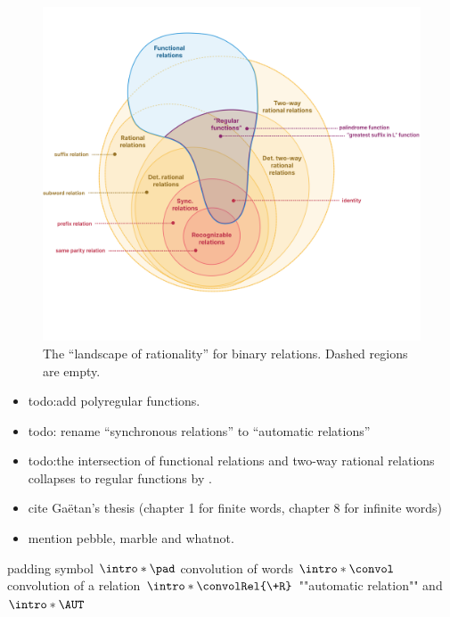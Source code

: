 \begin{figure}
	\centering
	\includegraphics[width=\linewidth]{fig/landscape-rationality-relations.png}
	\caption{
		\AP\label{fig:landscape-rationality-relations}
		The ``landscape of rationality'' for binary relations.
		Dashed regions are empty.
	}
\end{figure}


\begin{itemize}
	\item todo:add polyregular functions.
	\item todo: rename ``synchronous relations'' to ``automatic relations''
	\item todo:the intersection of
	functional relations and two-way rational relations
	collapses to regular functions by
	\cite[Theorem 22, p.~243]{EH2001transduction}.
	\item cite Gaëtan's thesis (chapter 1 for finite words, chapter 8 for infinite words)
	\item mention pebble, marble and whatnot.
\end{itemize}


\begin{itemize}
	\itemAP padding symbol $\intro*\pad$
	\itemAP convolution of words $\intro*\convol$
	\itemAP convolution of a relation $\intro*\convolRel{\+R}$
	\itemAP ""automatic relation"" and $\intro*\AUT$
\end{itemize}